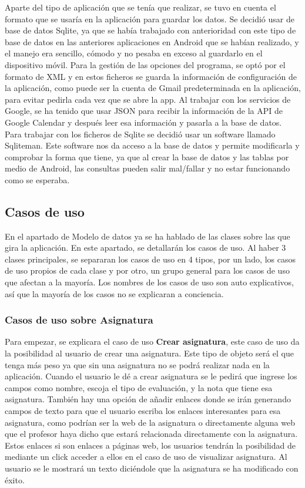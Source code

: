 Aparte del tipo de aplicación que se tenía que realizar, se tuvo en cuenta el formato que se usaría en la aplicación para guardar los datos.
Se decidió usar de base de datos Sqlite, ya que se había trabajado con anterioridad con este tipo de base de datos en las anteriores aplicaciones en Android que se habían realizado, y el manejo era sencillo, cómodo y no pesaba en exceso al guardarlo en el dispositivo móvil.
Para la gestión de las opciones del programa, se optó por el formato de XML y en estos ficheros se guarda la información de configuración de la aplicación, como puede ser la cuenta de Gmail predeterminada en la aplicación, para evitar pedirla cada vez que se abre la app.
Al trabajar con los servicios de Google, se ha tenido que usar JSON para recibir la información de la API de Google Calendar y después leer esa información y pasarla a la base de datos.
Para trabajar con los ficheros de Sqlite se decidió usar un software llamado Sqliteman.
Este software nos da acceso a la base de datos y permite modificarla y comprobar la forma que tiene, ya que al crear la base de datos y las tablas por medio de Android, las consultas pueden salir mal/fallar y no estar funcionando como se esperaba.

\subsection{Casos de uso}
\label{subsecc:casos de uso}

En el apartado de Modelo de datos ya se ha hablado de las clases sobre las que gira la aplicación.
En este apartado, se detallarán los casos de uso. Al haber 3 clases principales, se separaran los casos de uso en 4  tipos, por un lado, los casos de uso propios de cada clase y por otro, un grupo general para los casos de uso que afectan a la mayoría.
Los nombres de los casos de uso son auto explicativos, así que la mayoría de los casos no se explicaran a conciencia.

\subsubsection{Casos de uso sobre Asignatura}
\label{subsubsecc:Casos de uso sobre Asignatura}

Para empezar, se explicara el caso de uso \textbf{Crear asignatura}, este caso de uso da la posibilidad al usuario de crear una asignatura. Este tipo de objeto será el que tenga más peso ya que sin una asignatura no se podrá realizar nada en la aplicación.
Cuando el usuario le dé a crear asignatura se le pedirá que ingrese los campos como nombre, escoja el tipo de evaluación, y la nota que tiene esa asignatura.
También hay una opción de añadir enlaces donde se irán generando campos de texto para que el usuario escriba los enlaces interesantes para esa asignatura, como podrían ser la web de la asignatura o directamente alguna web que el profesor haya dicho que estará relacionada directamente con la asignatura. Estos enlaces si son enlaces a páginas web, los usuarios tendrán la posibilidad de mediante un click acceder a ellos en el caso de uso de visualizar asignatura.
Al usuario se le mostrará un texto diciéndole que la asignatura se ha modificado con éxito.

